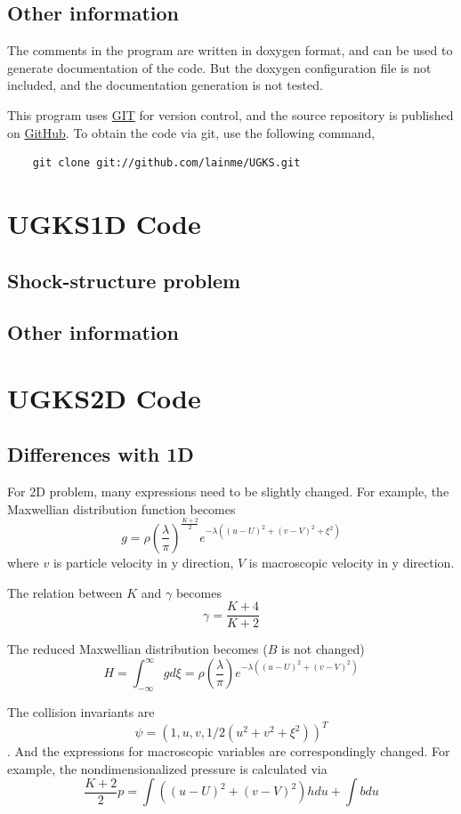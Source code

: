 \documentclass[a4paper]{book}
\begin{document}
\subsection{Other information}
The comments in the program are written in doxygen format, and can be used to generate documentation of the code. But the doxygen configuration file is not included, and the documentation generation is not tested.

This program uses \href{http://git-scm.com/}{GIT} for version control, and the source repository is published on \href{https://github.com/lainme/UGKS}{GitHub}. To obtain the code via git, use the following command,

\begin{verbatim}
    git clone git://github.com/lainme/UGKS.git
\end{verbatim}

\section{UGKS1D Code}
\subsection{Shock-structure problem}
\subsection{Other information}

\section{UGKS2D Code}
\subsection{Differences with 1D}
For 2D problem, many expressions need to be slightly changed. For example, the Maxwellian distribution function becomes
$$g=\rho\left(\frac{\lambda}{\pi}\right)^{\frac{K+2}{2}}e^{-\lambda((u-U)^2+(v-V)^2+\xi^2)}$$
where $v$ is particle velocity in y direction, $V$ is macroscopic velocity in y direction. 

The relation between $K$ and $\gamma$ becomes
$$\gamma=\frac{K+4}{K+2}$$

The reduced Maxwellian distribution becomes ($B$ is not changed)
$$H=\int_{-\infty}^{\infty}gd\xi=\rho\left(\frac{\lambda}{\pi}\right)e^{-\lambda((u-U)^2+(v-V)^2)}$$

The collision invariants are $$\psi=(1,u,v,1/2(u^2+v^2+\xi^2))^T$$. And the expressions for macroscopic variables are correspondingly changed. For example, the nondimensionalized pressure is calculated via
$$\frac{K+2}{2}p=\int((u-U)^2+(v-V)^2)hdu+\int bdu$$
\end{document}
